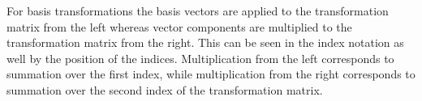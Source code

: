 For basis transformations the basis vectors are applied to the transformation matrix from
the left whereas vector components are multiplied to the transformation matrix from the
right. This can be seen in the index notation as well by the position of the indices.
Multiplication from the left corresponds to summation over the first index, while
multiplication from the right corresponds to summation over the second index of the
transformation matrix.

\newpage